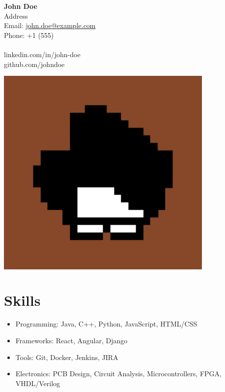 \documentclass[a4paper,12pt]{article} %
\begin{document}
\noindent
\begin{minipage}[c]{0.6\textwidth}
    {\LARGE \bfseries John Doe}\\
    Address\\
    Email: \href{mailto:john.doe@example.com}{john.doe@example.com}\\
    Phone: +1 (555)\\
    \bigskip\\
    linkedin.com/in/john-doe\\
    github.com/johndoe
\end{minipage}
\hfill
\begin{minipage}[c]{0.3\textwidth}
    \includegraphics[width=0.8\textwidth]{../resources/photo.jpg}
\end{minipage}

\section*{Skills}
\begin{itemize}[leftmargin=*]
    \item Programming: Java, C++, Python, JavaScript, HTML/CSS
    \item Frameworks: React, Angular, Django
    \item Tools: Git, Docker, Jenkins, JIRA
    \item Electronics: PCB Design, Circuit Analysis, Microcontrollers, FPGA, VHDL/Verilog
\end{itemize}
\end{document}
